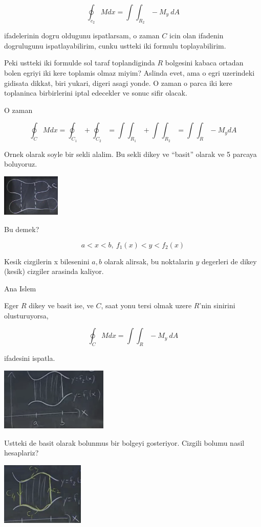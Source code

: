 \documentclass[12pt,fleqn]{article}
\begin{document}
\[ \oint_{c_2} M dx  = \int \int_{R_2} -M_y \ dA \]

ifadelerinin dogru oldugunu ispatlarsam, o zaman $C$ icin olan ifadenin
dogrulugunu ispatlayabilirim, cunku ustteki iki formulu toplayabilirim. 

Peki ustteki iki formulde sol taraf toplandiginda $R$ bolgesini kabaca
ortadan bolen egriyi iki kere toplamis olmaz miyim? Aslinda evet, ama o
egri uzerindeki gidisata dikkat, biri yukari, digeri asagi yonde. O zaman o
parca iki kere toplaninca birbirlerini iptal edecekler ve sonuc sifir olacak.

O zaman 

\[ \oint_C M dx = \oint_{C_1} + \oint_{C_2} =
\int \int_{R_1} + \int \int_{R_2} = 
\int \int_R -M_ydA
\]

Ornek olarak soyle bir sekli alalim. Bu sekli dikey ve ``basit'' olarak ve
5 parcaya boluyoruz.

\includegraphics[height=2cm]{22_6.png}

Bu demek? 

\[ a < x < b, \ f_1(x) < y < f_2(x) \]

Kesik cizgilerin x bilesenini $a,b$ olarak alirsak, bu noktalarin $y$
degerleri de dikey (kesik) cizgiler arasinda kaliyor. 

Ana Islem

Eger $R$ dikey ve basit ise, ve $C$, saat yonu tersi olmak uzere $R$'nin
sinirini olusturuyorsa, 

\[ \oint_C M dx  = \int \int_R -M_y \ dA \]

ifadesini ispatla. 

\includegraphics[height=3cm]{22_7.png}

Ustteki de basit olarak bolunmus bir bolgeyi gosteriyor. Cizgili bolumu
nasil hesaplariz?

\includegraphics[height=3cm]{22_8.png}
\end{document}
